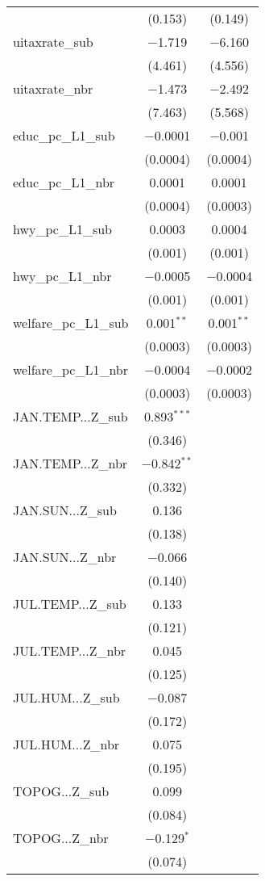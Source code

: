 \begin{table}[!htbp]
\begin{tabular}{@{\extracolsep{5pt}}lcc}
  & (0.153) & (0.149) \\ 
  uitaxrate\_sub & $-$1.719 & $-$6.160 \\ 
  & (4.461) & (4.556) \\ 
  uitaxrate\_nbr & $-$1.473 & $-$2.492 \\ 
  & (7.463) & (5.568) \\ 
  educ\_pc\_L1\_sub & $-$0.0001 & $-$0.001 \\ 
  & (0.0004) & (0.0004) \\ 
  educ\_pc\_L1\_nbr & 0.0001 & 0.0001 \\ 
  & (0.0004) & (0.0003) \\ 
  hwy\_pc\_L1\_sub & 0.0003 & 0.0004 \\ 
  & (0.001) & (0.001) \\ 
  hwy\_pc\_L1\_nbr & $-$0.0005 & $-$0.0004 \\ 
  & (0.001) & (0.001) \\ 
  welfare\_pc\_L1\_sub & 0.001$^{**}$ & 0.001$^{**}$ \\ 
  & (0.0003) & (0.0003) \\ 
  welfare\_pc\_L1\_nbr & $-$0.0004 & $-$0.0002 \\ 
  & (0.0003) & (0.0003) \\ 
  JAN.TEMP...Z\_sub & 0.893$^{***}$ &  \\ 
  & (0.346) &  \\ 
  JAN.TEMP...Z\_nbr & $-$0.842$^{**}$ &  \\ 
  & (0.332) &  \\ 
  JAN.SUN...Z\_sub & 0.136 &  \\ 
  & (0.138) &  \\ 
  JAN.SUN...Z\_nbr & $-$0.066 &  \\ 
  & (0.140) &  \\ 
  JUL.TEMP...Z\_sub & 0.133 &  \\ 
  & (0.121) &  \\ 
  JUL.TEMP...Z\_nbr & 0.045 &  \\ 
  & (0.125) &  \\ 
  JUL.HUM...Z\_sub & $-$0.087 &  \\ 
  & (0.172) &  \\ 
  JUL.HUM...Z\_nbr & 0.075 &  \\ 
  & (0.195) &  \\ 
  TOPOG...Z\_sub & 0.099 &  \\ 
  & (0.084) &  \\ 
  TOPOG...Z\_nbr & $-$0.129$^{*}$ &  \\ 
  & (0.074) &  \\ 

\end{tabular}
\end{table}
